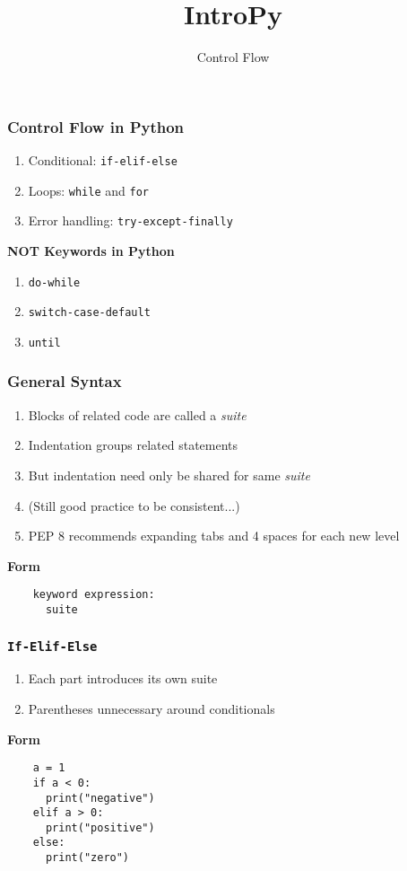 \documentclass{beamer}
\title{IntroPy}
\subtitle{Control Flow}
\begin{document}
\maketitle

\begin{frame}
  \frametitle{Control Flow in Python}

  \begin{enumerate}
    \item Conditional: \texttt{if-elif-else} 
    \item Loops: \texttt{while} and \texttt{for}
    \item Error handling: \texttt{try-except-finally}
  \end{enumerate}

  \textbf{NOT Keywords in Python}
  \begin{enumerate}
    \item \texttt{do-while}
    \item \texttt{switch-case-default}
    \item \texttt{until}
  \end{enumerate}
\end{frame}


\begin{frame}[fragile]
  \frametitle{General Syntax}

  \begin{enumerate}
    \item Blocks of related code are called a \textit{suite}
    \item Indentation groups related statements
    \item But indentation need only be shared for same \textit{suite} 
    \item (Still good practice to be consistent...)
    \item PEP 8 recommends expanding tabs and 4 spaces for each new level
  \end{enumerate}

  \textbf{Form}
  \begin{lstlisting}
    keyword expression:
      suite
  \end{lstlisting}
\end{frame}

\begin{frame}[fragile]
  \frametitle{\texttt{If-Elif-Else}}

  \begin{enumerate}
    \item Each part introduces its own suite
    \item Parentheses unnecessary around conditionals
  \end{enumerate}

  \textbf{Form}
  \begin{lstlisting}
    a = 1
    if a < 0:
      print("negative")
    elif a > 0:
      print("positive")
    else:
      print("zero")
  \end{lstlisting}
\end{frame}
\end{document}
